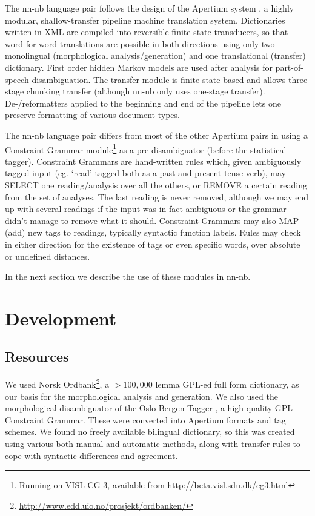 \documentclass[11pt]{article}
\begin{document}
  \label{SEC:design}

The nn-nb language pair follows the design of the Apertium system
\citep{corbi05oss}, a highly modular, shallow-transfer pipeline
machine translation system. Dictionaries written in XML are compiled
into reversible finite state transducers, so that word-for-word
translations are possible in both directions using only two
monolingual (morphological analysis/generation) and one translational
(transfer) dictionary. First order hidden Markov models are used after
analysis for part-of-speech disambiguation. The transfer module is
finite state based and allows three-stage chunking transfer (although
nn-nb only uses one-stage transfer). De-/reformatters applied to the
beginning and end of the pipeline lets one preserve formatting of
various document types.

The nn-nb language pair differs from most of the other Apertium pairs
in using a Constraint Grammar module\footnote{Running on VISL CG-3, available from
\href{http://beta.visl.sdu.dk/cg3.html}{http://beta.visl.sdu.dk/cg3.html} } as a pre-disambiguator
(before the statistical tagger). Constraint Grammars
\citep{karlsson1990cgf} are hand-written rules which, given
ambiguously tagged input (eg. `read' tagged both as a past and present
tense verb), may SELECT one reading/analysis over all the others, or
REMOVE a certain reading from the set of analyses. The last reading is
never removed, although we may end up with several readings if the
input was in fact ambiguous or the grammar didn't manage to remove
what it should. Constraint Grammars may also MAP (add) new tags to
readings, typically syntactic function labels. Rules may check in
either direction for the existence of tags or even specific words,
over absolute or undefined distances.

In the next section we describe the use of these modules in nn-nb.



\section{Development}
\label{sec-3}

  \label{SEC:development}
\subsection{Resources}
\label{sec-3.1}

We used Norsk Ordbank\footnote{\href{http://www.edd.uio.no/prosjekt/ordbanken/}{http://www.edd.uio.no/prosjekt/ordbanken/} }, a $>100,000$ lemma GPL-ed full form
dictionary, as our basis for the morphological analysis and
generation. We also used the morphological disambiguator of the
Oslo-Bergen Tagger \citep{hagen2000cbt}, a high quality GPL Constraint
Grammar. These were converted into Apertium formats and tag
schemes. We found no freely available bilingual dictionary, so this
was created using various both manual and automatic methods, along
with transfer rules to cope with syntactic differences and agreement.
\end{document}
